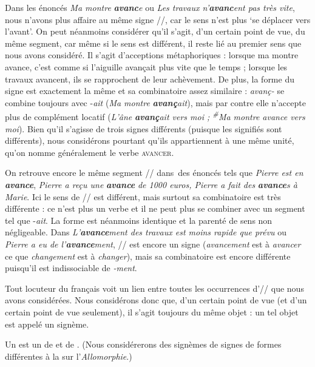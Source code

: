 Dans les énoncés \textit{Ma montre} \textbf{\textit{avanc}}\textit{e} ou \textit{Les travaux n’}\textbf{\textit{avanc}}\textit{ent pas très vite}, nous n’avons plus affaire au même signe //, car le sens n’est plus ‘se déplacer vers l’avant’. On peut néanmoins considérer qu’il s’agit, d’un certain point de vue, du même segment, car même si le sens est différent, il reste lié au premier sens que nous avons considéré. Il s’agit d’acceptions métaphoriques : lorsque ma montre avance, c’est comme si l’aiguille avançait plus vite que le temps ; lorsque les travaux avancent, ils se rapprochent de leur achèvement. De plus, la forme du signe est exactement la même et sa combinatoire assez similaire : \textit{avanç-} se combine toujours avec -\textit{ait} (\textit{Ma montre} \textbf{\textit{avanç}}\textit{ait}), mais par contre elle n’accepte plus de complément locatif (\textit{L’âne} \textbf{\textit{avanç}}\textit{ait vers moi ; \textsuperscript{\#}}\textit{Ma montre avance vers moi}). Bien qu’il s’agisse de trois signes différents (puisque les signifiés sont différents), nous considérons pourtant qu’ils appartiennent à une même unité, qu’on nomme généralement le verbe \textsc{avancer}.

On retrouve encore le même segment // dans~des énoncés tels que \textit{Pierre est en} \textbf{\textit{avance}}, \textit{Pierre a reçu une} \textbf{\textit{avance}} \textit{de 1000 euros, Pierre a fait des} \textbf{\textit{avance}}\textit{s à Marie}. Ici le sens de // est différent, mais surtout sa combinatoire est très différente : ce n’est plus un verbe et il ne peut plus se combiner avec un segment tel que -\textit{ait}. La forme est néanmoins identique et la parenté de sens non négligeable. Dans \textit{L’}\textbf{\textit{avance}}\textit{ment des travaux est moins rapide que prévu} ou \textit{Pierre a eu de l’}\textbf{\textit{avance}}\textit{ment}, // est encore un signe (\textit{avancement} est à \textit{avancer} ce que \textit{changement} est à \textit{changer}), mais sa combinatoire est encore différente puisqu’il est indissociable de \textit{{}-ment}.

Tout locuteur du français voit un lien entre toutes les occurrences d’// que nous avons considérées. Nous considérons donc que, d’un certain point de vue (et d’un certain point de vue seulement), il s’agit toujours du même objet : un tel objet est appelé un signème.

{Un  est un  de  et de . (Nous considérerons des signèmes de signes de formes différentes à la  sur l’\textit{Allomorphie}.)}

